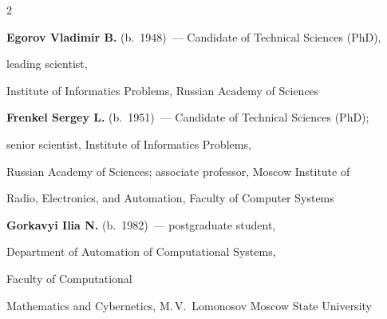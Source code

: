 \begin{multicols}{2}
\vspace*{3pt}






















\noindent %


\textbf{Egorov Vladimir B.} (b.\ 1948)~--- Candidate of Technical Sciences (PhD),


leading scientist,


Institute of Informatics Problems, Russian Academy of Sciences





\vspace*{3pt}





\noindent


\textbf{Frenkel Sergey L.} (b.\ 1951)~--- Candidate of Technical Sciences (PhD);


senior scientist, Institute of Informatics Problems,


Russian Academy of Sciences; associate professor, Moscow Institute of


Radio, Electronics, and Automation, Faculty of Computer Systems





\vspace*{3pt}





\noindent


\textbf{Gorkavyi Ilia N.} (b.\ 1982)~--- postgraduate student,


Department of Automation of Computational Systems,


Faculty of  Computational


Mathematics and Cybernetics, M.\,V.~Lomonosov Moscow State University






\end{multicols}
